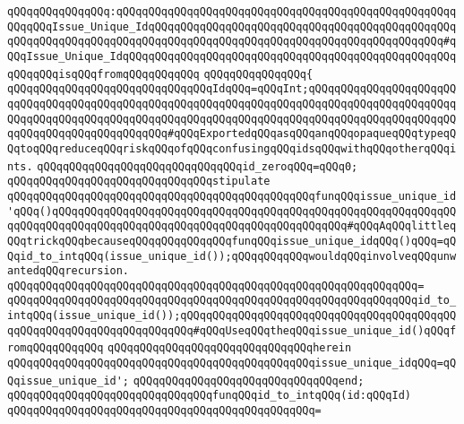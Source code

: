 \verb|qQQqqQQqqQQqqQQq:qQQqqQQqqQQqqQQqqQQqqQQqqQQqqQQqqQQqqQQqqQQqqQQqqQQqqQQqqQQqIssue_Unique_IdqQQqqQQqqQQqqQQqqQQqqQQqqQQqqQQqqQQqqQQqqQQqqQQqqQQqqQQqqQQqqQQqqQQqqQQqqQQqqQQqqQQqqQQqqQQqqQQqqQQqqQQqqQQqqQQqqQQq#qQQqIssue_Unique_IdqQQqqQQqqQQqqQQqqQQqqQQqqQQqqQQqqQQqqQQqqQQqqQQqqQQqqQQqqQQqisqQQqfromqQQqqQQqqQQq|\newline
\verb|qQQqqQQqqQQqqQQq{|\newline
\verb|qQQqqQQqqQQqqQQqqQQqqQQqqQQqqQQqIdqQQq=qQQqInt;qQQqqQQqqQQqqQQqqQQqqQQqqQQqqQQqqQQqqQQqqQQqqQQqqQQqqQQqqQQqqQQqqQQqqQQqqQQqqQQqqQQqqQQqqQQqqQQqqQQqqQQqqQQqqQQqqQQqqQQqqQQqqQQqqQQqqQQqqQQqqQQqqQQqqQQqqQQqqQQqqQQqqQQqqQQqqQQqqQQqqQQqqQQq#qQQqExportedqQQqasqQQqanqQQqopaqueqQQqtypeqQQqtoqQQqreduceqQQqriskqQQqofqQQqconfusingqQQqidsqQQqwithqQQqotherqQQqints.|\newline
\verb|qQQqqQQqqQQqqQQqqQQqqQQqqQQqqQQqid_zeroqQQq=qQQq0;|\newline
\newline
\verb|qQQqqQQqqQQqqQQqqQQqqQQqqQQqqQQqstipulate|\newline
\verb|qQQqqQQqqQQqqQQqqQQqqQQqqQQqqQQqqQQqqQQqqQQqqQQqfunqQQqissue_unique_id'qQQq()qQQqqQQqqQQqqQQqqQQqqQQqqQQqqQQqqQQqqQQqqQQqqQQqqQQqqQQqqQQqqQQqqQQqqQQqqQQqqQQqqQQqqQQqqQQqqQQqqQQqqQQqqQQqqQQqqQQq#qQQqAqQQqlittleqQQqtrickqQQqbecauseqQQqqQQqqQQqqQQqfunqQQqissue_unique_idqQQq()qQQq=qQQqid_to_intqQQq(issue_unique_id());qQQqqQQqqQQqwouldqQQqinvolveqQQqunwantedqQQqrecursion.|\newline
\verb|qQQqqQQqqQQqqQQqqQQqqQQqqQQqqQQqqQQqqQQqqQQqqQQqqQQqqQQqqQQqqQQq=|\newline
\verb|qQQqqQQqqQQqqQQqqQQqqQQqqQQqqQQqqQQqqQQqqQQqqQQqqQQqqQQqqQQqqQQqid_to_intqQQq(issue_unique_id());qQQqqQQqqQQqqQQqqQQqqQQqqQQqqQQqqQQqqQQqqQQqqQQqqQQqqQQqqQQqqQQqqQQqqQQq#qQQqUseqQQqtheqQQqissue_unique_id()qQQqfromqQQqqQQqqQQq|\newline
\verb|qQQqqQQqqQQqqQQqqQQqqQQqqQQqqQQqherein|\newline
\verb|qQQqqQQqqQQqqQQqqQQqqQQqqQQqqQQqqQQqqQQqqQQqqQQqissue_unique_idqQQq=qQQqissue_unique_id';|\newline
\verb|qQQqqQQqqQQqqQQqqQQqqQQqqQQqqQQqend;|\newline
\newline
\verb|qQQqqQQqqQQqqQQqqQQqqQQqqQQqqQQqfunqQQqid_to_intqQQq(id:qQQqId)|\newline
\verb|qQQqqQQqqQQqqQQqqQQqqQQqqQQqqQQqqQQqqQQqqQQqqQQq=|\newline
